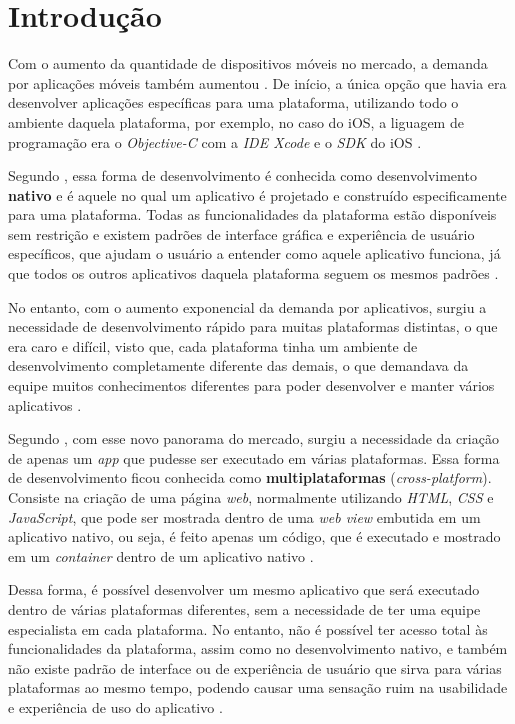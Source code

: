 \chapter{Introdução} \label{cap:introducao}

Com o aumento da quantidade de dispositivos móveis no mercado, a demanda por aplicações móveis também aumentou \cite{cevallos_case_2014}.
De início, a única opção que havia era desenvolver aplicações específicas para uma plataforma, utilizando todo o ambiente daquela plataforma, por exemplo,
no caso do iOS, a liguagem de programação era o \textit{Objective-C} com a \textit{IDE Xcode} e o \textit{SDK} do iOS \cite{heitkotter_comparing_2013}.

Segundo , essa forma de desenvolvimento é conhecida como desenvolvimento \textbf{nativo} e é aquele no qual um aplicativo é projetado e construído especificamente para uma plataforma. 
Todas as funcionalidades da plataforma estão disponíveis sem restrição e existem padrões de interface gráfica e experiência de usuário específicos, que ajudam o usuário a 
entender como aquele aplicativo funciona, já que todos os outros aplicativos daquela plataforma seguem os mesmos padrões \cite{corral_ant_2012}. 

No entanto, com o aumento exponencial da demanda por aplicativos, surgiu a necessidade de desenvolvimento rápido para muitas plataformas distintas, o que era caro e difícil,
visto que, cada plataforma tinha um ambiente de desenvolvimento completamente diferente das demais, o que demandava da equipe muitos conhecimentos diferentes
para poder desenvolver e manter vários aplicativos \cite{prezotto_estudo_2014}.

Segundo , com esse novo panorama do mercado, surgiu a necessidade da criação de apenas um \textit{app} que pudesse ser executado 
em várias plataformas. Essa forma de desenvolvimento ficou conhecida como \textbf{multiplataformas} (\textit{cross-platform}). 
Consiste na criação de uma página \textit{web}, normalmente utilizando \textit{HTML}, \textit{CSS} e \textit{JavaScript}, que pode ser mostrada dentro de uma \textit{web view} 
embutida em um aplicativo nativo, ou seja, é feito apenas um código, que é executado e mostrado em um \textit{container} dentro de um aplicativo nativo \cite{stark_building_2010, heitkotter_comparing_2013}. 

Dessa forma, é possível desenvolver um mesmo aplicativo que será executado dentro de várias plataformas diferentes, sem a necessidade de ter uma equipe especialista em cada plataforma.
No entanto, não é possível ter acesso total às funcionalidades da plataforma, assim como no desenvolvimento nativo, e também não existe padrão de interface ou de experiência de usuário que sirva
para várias plataformas ao mesmo tempo, podendo causar uma sensação ruim na usabilidade e experiência de uso do aplicativo \cite{corral_ant_2012}.

